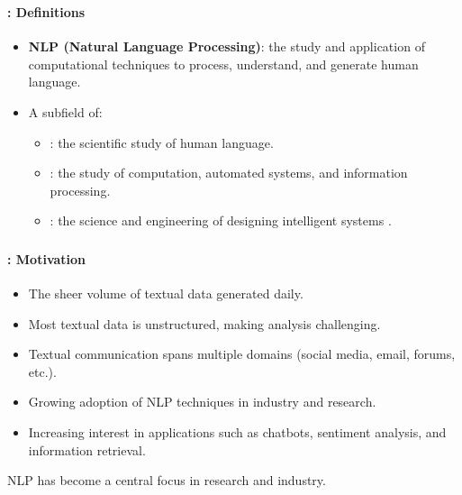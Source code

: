 \documentclass[xcolor=table]{beamer}
\subtitle[01- Introduction]{Chapter 01\\Introduction to NLP}
\begin{document}
	
\begin{frame}
	\frametitle{\inserttitle}
	\framesubtitle{\insertshortsubtitle: Definitions}
	
	\begin{itemize}
		\item \textbf{NLP (Natural Language Processing)}: the study and application of computational techniques to process, understand, and generate human language.
	\end{itemize}
	\begin{minipage}{0.78\textwidth}
		\begin{itemize}
			\item A subfield of:
			\begin{itemize}
				\item {}: the scientific study of human language.
				\item {}: the study of computation, automated systems, and information processing.
				\item {}: the science and engineering of designing intelligent systems \cite{1955-mccarthy}.
			\end{itemize}
		\end{itemize}
	\end{minipage}
	\begin{minipage}{0.20\textwidth}
	\end{minipage}

\end{frame}

\begin{frame}
	\frametitle{\inserttitle}
	\framesubtitle{\insertshortsubtitle: Motivation}
	
	\begin{itemize}
		\item The sheer volume of textual data generated daily.
		\item Most textual data is unstructured, making analysis challenging.
		\item Textual communication spans multiple domains (social media, email, forums, etc.).
		\item Growing adoption of NLP techniques in industry and research.
		\item Increasing interest in applications such as chatbots, sentiment analysis, and information retrieval.
	\end{itemize}
	
	\begin{center}
		{\Large NLP has become a central focus in research and industry.}
	\end{center}

\end{frame}
\end{document}
